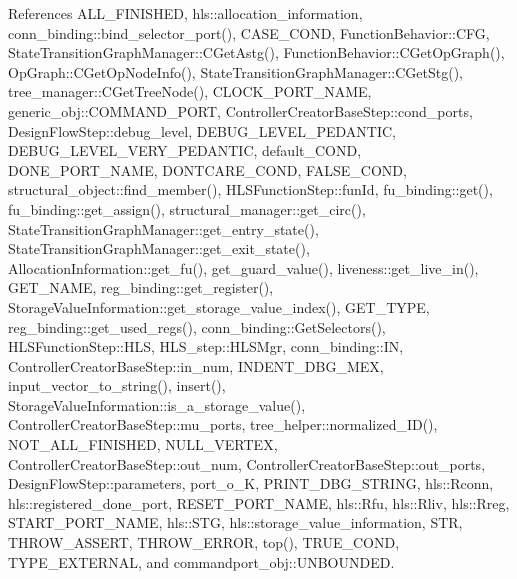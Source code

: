 References A\+L\+L\+\_\+\+F\+I\+N\+I\+S\+H\+ED, hls\+::allocation\+\_\+information, conn\+\_\+binding\+::bind\+\_\+selector\+\_\+port(), C\+A\+S\+E\+\_\+\+C\+O\+ND, Function\+Behavior\+::\+C\+FG, State\+Transition\+Graph\+Manager\+::\+C\+Get\+Astg(), Function\+Behavior\+::\+C\+Get\+Op\+Graph(), Op\+Graph\+::\+C\+Get\+Op\+Node\+Info(), State\+Transition\+Graph\+Manager\+::\+C\+Get\+Stg(), tree\+\_\+manager\+::\+C\+Get\+Tree\+Node(), C\+L\+O\+C\+K\+\_\+\+P\+O\+R\+T\+\_\+\+N\+A\+ME, generic\+\_\+obj\+::\+C\+O\+M\+M\+A\+N\+D\+\_\+\+P\+O\+RT, Controller\+Creator\+Base\+Step\+::cond\+\_\+ports, Design\+Flow\+Step\+::debug\+\_\+level, D\+E\+B\+U\+G\+\_\+\+L\+E\+V\+E\+L\+\_\+\+P\+E\+D\+A\+N\+T\+IC, D\+E\+B\+U\+G\+\_\+\+L\+E\+V\+E\+L\+\_\+\+V\+E\+R\+Y\+\_\+\+P\+E\+D\+A\+N\+T\+IC, default\+\_\+\+C\+O\+ND, D\+O\+N\+E\+\_\+\+P\+O\+R\+T\+\_\+\+N\+A\+ME, D\+O\+N\+T\+C\+A\+R\+E\+\_\+\+C\+O\+ND, F\+A\+L\+S\+E\+\_\+\+C\+O\+ND, structural\+\_\+object\+::find\+\_\+member(), H\+L\+S\+Function\+Step\+::fun\+Id, fu\+\_\+binding\+::get(), fu\+\_\+binding\+::get\+\_\+assign(), structural\+\_\+manager\+::get\+\_\+circ(), State\+Transition\+Graph\+Manager\+::get\+\_\+entry\+\_\+state(), State\+Transition\+Graph\+Manager\+::get\+\_\+exit\+\_\+state(), Allocation\+Information\+::get\+\_\+fu(), get\+\_\+guard\+\_\+value(), liveness\+::get\+\_\+live\+\_\+in(), G\+E\+T\+\_\+\+N\+A\+ME, reg\+\_\+binding\+::get\+\_\+register(), Storage\+Value\+Information\+::get\+\_\+storage\+\_\+value\+\_\+index(), G\+E\+T\+\_\+\+T\+Y\+PE, reg\+\_\+binding\+::get\+\_\+used\+\_\+regs(), conn\+\_\+binding\+::\+Get\+Selectors(), H\+L\+S\+Function\+Step\+::\+H\+LS, H\+L\+S\+\_\+step\+::\+H\+L\+S\+Mgr, conn\+\_\+binding\+::\+IN, Controller\+Creator\+Base\+Step\+::in\+\_\+num, I\+N\+D\+E\+N\+T\+\_\+\+D\+B\+G\+\_\+\+M\+EX, input\+\_\+vector\+\_\+to\+\_\+string(), insert(), Storage\+Value\+Information\+::is\+\_\+a\+\_\+storage\+\_\+value(), Controller\+Creator\+Base\+Step\+::mu\+\_\+ports, tree\+\_\+helper\+::normalized\+\_\+\+I\+D(), N\+O\+T\+\_\+\+A\+L\+L\+\_\+\+F\+I\+N\+I\+S\+H\+ED, N\+U\+L\+L\+\_\+\+V\+E\+R\+T\+EX, Controller\+Creator\+Base\+Step\+::out\+\_\+num, Controller\+Creator\+Base\+Step\+::out\+\_\+ports, Design\+Flow\+Step\+::parameters, port\+\_\+o\+\_\+K, P\+R\+I\+N\+T\+\_\+\+D\+B\+G\+\_\+\+S\+T\+R\+I\+NG, hls\+::\+Rconn, hls\+::registered\+\_\+done\+\_\+port, R\+E\+S\+E\+T\+\_\+\+P\+O\+R\+T\+\_\+\+N\+A\+ME, hls\+::\+Rfu, hls\+::\+Rliv, hls\+::\+Rreg, S\+T\+A\+R\+T\+\_\+\+P\+O\+R\+T\+\_\+\+N\+A\+ME, hls\+::\+S\+TG, hls\+::storage\+\_\+value\+\_\+information, S\+TR, T\+H\+R\+O\+W\+\_\+\+A\+S\+S\+E\+RT, T\+H\+R\+O\+W\+\_\+\+E\+R\+R\+OR, top(), T\+R\+U\+E\+\_\+\+C\+O\+ND, T\+Y\+P\+E\+\_\+\+E\+X\+T\+E\+R\+N\+AL, and commandport\+\_\+obj\+::\+U\+N\+B\+O\+U\+N\+D\+ED.



